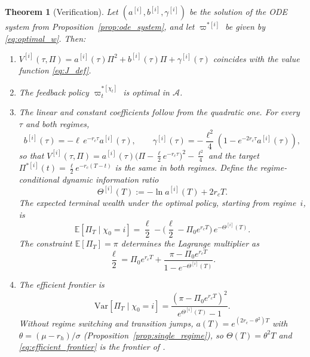 \documentclass[11pt,a4paper]{article}
\numberwithin{equation}{section}
\newtheorem{theorem}{Theorem}[section]
\newcommand{\E}{\mathbb{E}}
\newcommand{\Var}{\mathrm{Var}}
\begin{document}
\begin{theorem}[Verification]\label{thm:verification}
Let $(a^{[i]}, b^{[i]}, \gamma^{[i]})$ be the solution of the ODE system from Proposition~\ref{prop:ode_system}, and let $\varpi^{*[i]}$ be given by \eqref{eq:optimal_w}. Then:
\begin{enumerate}[label=(\alph*)]
\item $V^{[i]}(\tau, \Pi) = a^{[i]}(\tau)\Pi^2 + b^{[i]}(\tau)\Pi + \gamma^{[i]}(\tau)$ coincides with the value function \eqref{eq:J_def}.
\item The feedback policy $\varpi^{*[\chi_t]}_t$ is optimal in $\mathcal{A}$.
\item The linear and constant coefficients follow from the quadratic one. For every $\tau$ and both regimes,
\begin{equation}\label{eq:b_gamma_identity}
b^{[i]}(\tau) = -\ell\, e^{-r_c \tau} a^{[i]}(\tau), \qquad \gamma^{[i]}(\tau) = -\frac{\ell^2}{4}\left(1 - e^{-2 r_c \tau} a^{[i]}(\tau)\right),
\end{equation}
so that $V^{[i]}(\tau, \Pi) = a^{[i]}(\tau)\big(\Pi - \tfrac{\ell}{2}e^{-r_c\tau}\big)^2 - \tfrac{\ell^2}{4}$ and the target $\Pi^{*[i]}(t) = \tfrac{\ell}{2}e^{-r_c(T-t)}$ is the same in both regimes. Define the regime-conditional dynamic information ratio
\begin{equation}\label{eq:theta_def}
\Theta^{[i]}(T) := -\ln a^{[i]}(T) + 2 r_c T.
\end{equation}
The expected terminal wealth under the optimal policy, starting from regime~$i$, is
\begin{equation}\label{eq:expected_wealth}
\E[\Pi_T \mid \chi_0 = i] = \frac{\ell}{2} - \Big(\frac{\ell}{2} - \Pi_0 e^{r_c T}\Big)\, e^{-\Theta^{[i]}(T)}.
\end{equation}
The constraint $\E[\Pi_T] = \pi$ determines the Lagrange multiplier as
\begin{equation}\label{eq:ell_determination}
\frac{\ell}{2} = \Pi_0 e^{r_c T} + \frac{\pi - \Pi_0 e^{r_c T}}{1 - e^{-\Theta^{[i]}(T)}}.
\end{equation}
\item The efficient frontier is
\begin{equation}\label{eq:efficient_frontier}
\Var[\Pi_T \mid \chi_0 = i] = \frac{(\pi - \Pi_0 e^{r_c T})^2}{e^{\Theta^{[i]}(T)} - 1}.
\end{equation}
Without regime switching and transition jumps, $a(T) = e^{(2r_c - \theta^2)T}$ with $\theta = (\mu - r_h)/\sigma$ (Proposition~\ref{prop:single_regime}), so $\Theta(T) = \theta^2 T$ and \eqref{eq:efficient_frontier} is the frontier of \citet{ZhouLi2000}.
\end{enumerate}
\end{theorem}
\end{document}
